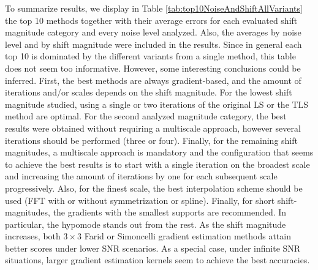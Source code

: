 %

To summarize results, we display in Table \ref{tab:top10NoiseAndShiftAllVariants} the top 10 methods together with their average errors for each evaluated shift magnitude category and every noise level analyzed. Also, the averages by noise level and by shift magnitude were included in the results. Since in general each top 10 is dominated by the different variants from a single method, this table does not seem too informative. However, some interesting conclusions could be inferred. First, the best methods are always gradient-based, and the amount of iterations and/or scales depends on the shift magnitude. For the lowest shift magnitude studied, using a single or two iterations of the original LS or the TLS method are optimal. For the second analyzed magnitude category, the best results were obtained without requiring a multiscale approach, however several iterations should be performed (three or four). Finally, for the remaining shift magnitudes, a multiscale approach is mandatory and the configuration that seems to achieve the best results is to start with a single iteration on the broadest scale and increasing the amount of iterations by one for each subsequent scale progressively. Also, for the finest scale, the best interpolation scheme should be used (FFT with or without symmetrization or spline). Finally, for short shift-magnitudes, the gradients with the smallest supports are recommended. In particular, the hypomode stands out from the rest. As the shift magnitude increases, both  $3\times 3$ Farid or Simoncelli gradient estimation methods attain better scores under lower SNR scenarios. As a special case, under infinite SNR situations, larger gradient estimation kernels seem to achieve the best accuracies.

